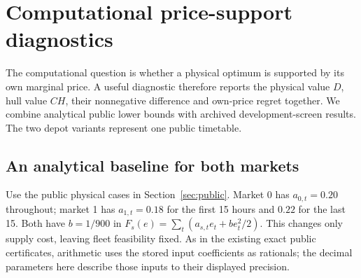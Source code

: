 \section{Computational price-support diagnostics}\label{sec:computational}

The computational question is whether a physical optimum is supported by its
own marginal price. A useful diagnostic therefore reports the physical value
$D$, hull value $CH$, their nonnegative difference and own-price regret together.
We combine analytical public lower bounds with archived development-screen
results. The two depot variants represent one public timetable.

\subsection{An analytical baseline for both markets}

Use the public physical cases in Section~\ref{sec:public}. Market 0 has
$a_{0,t}=0.20$ throughout; market 1 has $a_{1,t}=0.18$ for the first 15 hours
and $0.22$ for the last 15. Both have $b=1/900$ in
$F_s(e)=\sum_t(a_{s,t}e_t+b e_t^2/2)$. This changes only supply cost, leaving
fleet feasibility fixed. As in the existing exact public certificates,
arithmetic uses the stored input coefficients as rationals; the decimal
parameters here describe those inputs to their displayed precision.

